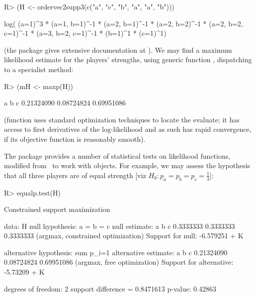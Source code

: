 \documentclass[article]{jss}
\begin{document}
\begin{Schunk}
\begin{Sinput}
R> (H <- ordervec2supp3(c("a", "c", "b", "a", "a", "b")))
\end{Sinput}
\begin{Soutput}
log( (a=1)^3 * (a=1, b=1)^-1 * (a=2, b=1)^-1 * (a=2, b=2)^-1 * (a=2,
b=2, c=1)^-1 * (a=3, b=2, c=1)^-1 * (b=1)^1 * (c=1)^1)
\end{Soutput}
\end{Schunk}

(the package gives extensive documentation at
).  We may find a maximum likelihood estimate
for the players' strengths, using generic function ,
dispatching to a specialist  method:

\begin{Schunk}
\begin{Sinput}
R> (mH <- maxp(H))
\end{Sinput}
\begin{Soutput}
         a          b          c 
0.21324090 0.08724824 0.69951086 
\end{Soutput}
\end{Schunk}

(function  uses standard optimization techniques to
locate the evaluate; it has access to first derivatives of the
log-likelihood and as such has rapid convergence, if its objective
function is reasonably smooth).

The package provides a number of statistical tests on likelihood
functions, modified from~\citet{hankin2017} to work with 
objects.  For example, we may assess the hypothesis that all three
players are of equal strength [viz $H_0\colon
p_a=p_b=p_c=\frac{1}{3}$]:

\begin{Schunk}
\begin{Sinput}
R> equalp.test(H)
\end{Sinput}
\begin{Soutput}
	Constrained support maximization

data:  H
null hypothesis: a = b = c
null estimate:
        a         b         c 
0.3333333 0.3333333 0.3333333 
(argmax, constrained optimization)
Support for null:  -6.579251 + K

alternative hypothesis:  sum p_i=1 
alternative estimate:
         a          b          c 
0.21324090 0.08724824 0.69951086 
(argmax, free optimization)
Support for alternative:  -5.73209 + K

degrees of freedom: 2
support difference = 0.8471613
p-value: 0.42863 
\end{Soutput}
\end{Schunk}
\end{document}
